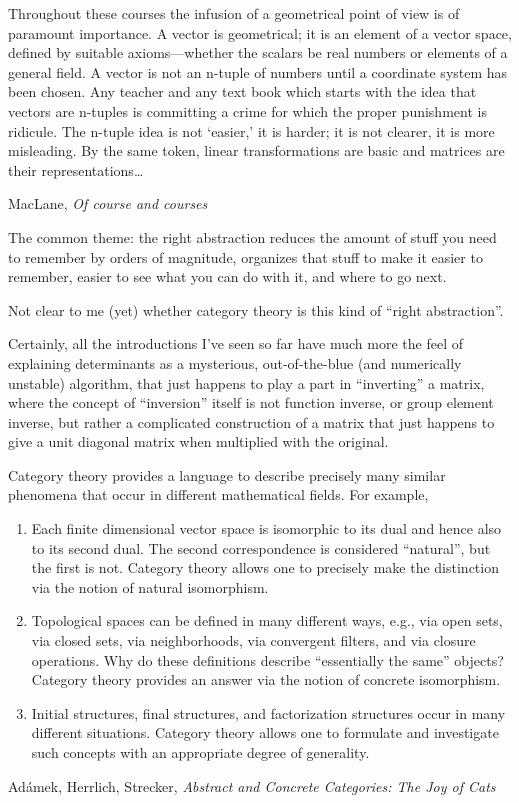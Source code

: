 \documentclass[11pt,openany]{article}
\begin{document}
\epigraph{Throughout these courses the infusion of a geometrical
point of view is of paramount importance. A vector
is geometrical; it is an element of a vector space, defined
by suitable axioms—whether the scalars be real numbers or
elements of a general field. A vector is not an n-tuple of
numbers until a coordinate system has been chosen. Any
teacher and any text book which starts with the idea that vectors
are n-tuples is committing a crime for which the proper
punishment is ridicule. The n-tuple idea is not ‘easier,’ it is
harder; it is not clearer, it is more misleading. By the same
token, linear transformations are basic and matrices are their
representations\ldots}
{MacLane, \textit{Of course and courses}~\cite{MacLane:1954}}

The common theme: the right abstraction reduces 
the amount of stuff you need to remember by orders of magnitude,
organizes that stuff to make it easier to remember,
easier to see what you can do with it,
and where to go next.

Not clear to me (yet) whether category theory is this kind of
``right abstraction''. 

Certainly, all the introductions I've seen so far have much more
the feel of explaining determinants as a mysterious,
out-of-the-blue (and numerically unstable) algorithm,
that just happens to play a part in ``inverting'' a matrix,
where the concept of ``inversion'' itself is not 
function inverse, or group element inverse,
but rather a complicated construction of a matrix that
just happens to give a unit diagonal matrix when multiplied with 
the original.

\setcounter{currentlevel}{\value{baseSectionLevel}}
\label{sec:Why?}

\setlength{\epigraphwidth}{0.95\linewidth}

\epigraph{Category theory provides a language to describe precisely many similar phenomena that
occur in different mathematical fields. For example,
\begin{enumerate}
  \item  Each finite dimensional vector space is isomorphic to its dual and hence also to its
second dual. The second correspondence is considered “natural”, but the first is
not. Category theory allows one to precisely make the distinction via the notion
of natural isomorphism.
\item Topological spaces can be defined in many different ways, e.g., via open sets, via
closed sets, via neighborhoods, via convergent filters, and via closure operations.
Why do these definitions describe “essentially the same” objects? Category theory
provides an answer via the notion of concrete isomorphism.
\item Initial structures, final structures, and factorization structures occur in many different
situations. Category theory allows one to formulate and investigate such
concepts with an appropriate degree of generality.
\end{enumerate}
\leavevmode }
{Ad\'{a}mek, Herrlich, Strecker, 
\textit{Abstract and Concrete Categories:
The Joy of Cats}~\cite{adamek-herrlich-strecker-1990}}
\end{document}
